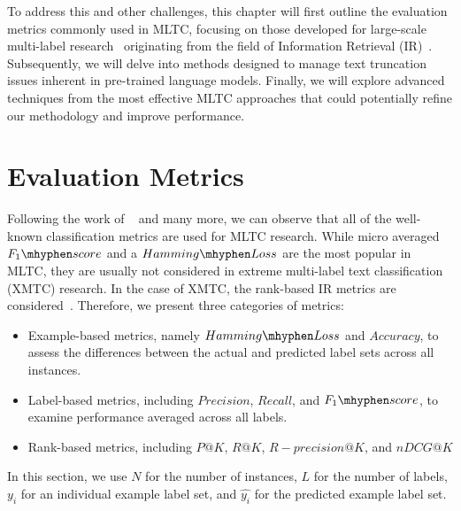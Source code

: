 To address this and other challenges, this chapter will first outline the evaluation metrics commonly used in MLTC, focusing on those developed for large-scale multi-label research~\parencite{bhatia2016extremerepo} originating from the field of Information Retrieval (IR)~\parencite{manning2008}. 
Subsequently, we will delve into methods designed to manage text truncation issues inherent in pre-trained language models. 
Finally, we will explore advanced techniques from the most effective MLTC approaches that could potentially refine our methodology and improve performance.

\section{Evaluation Metrics}
Following the work of ~\textcite{tsoumakas2010, madjarov2012, tarekegn2024deeplearningmultilabellearning} and many more, we can observe that all of the well-known classification metrics are used for MLTC research.
While micro averaged $F_1\mhyphen score$ and a $Hamming\mhyphen Loss$ are the most popular in MLTC, they are usually not considered in extreme multi-label text classification (XMTC) research.
In the case of XMTC, the rank-based IR metrics are considered~\parencite{manning2008, bhatia2016extremerepo, chalkidis-etal-2019-large, you2019attentionxmllabeltreebasedattentionaware, chang2020tamingpretrainedtransformersextreme, zhang2023longtailed}.
Therefore, we present three categories of metrics:
\begin{itemize}\itemsep=0pt
    \item Example-based metrics, namely $Hamming\mhyphen Loss$ and $Accuracy$, to assess the differences between the actual and predicted label sets across all instances.
    \item Label-based metrics, including $Precision$, $Recall$, and $F_1\mhyphen score$, to examine performance averaged across all labels.
    \item Rank-based metrics, including $P@K$, $R@K$, $R-precision@K$, and $nDCG@K$
\end{itemize}

In this section, we use $N$ for the number of instances, $L$ for the number of labels, $y_i$ for an individual example label set, and $\hat{y_i}$ for the predicted example label set.

